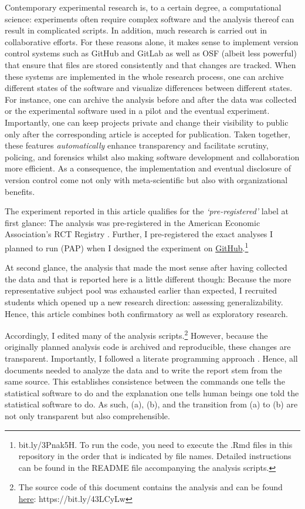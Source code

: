 \documentclass[
  authoryear,
  review,
  3p,
  onecolumn]{elsarticle}
\begin{document}
Contemporary experimental research is, to a certain degree, a
computational science: experiments often require complex software and
the analysis thereof can result in complicated scripts. In addition,
much research is carried out in collaborative efforts. For these reasons
alone, it makes sense to implement version control systems such as
GitHub and GitLab as well as OSF (albeit less powerful) that ensure that
files are stored consistently and that changes are tracked. When these
systems are implemented in the whole research process, one can archive
different states of the software and visualize differences between
different states. For instance, one can archive the analysis before and
after the data was collected or the experimental software used in a
pilot and the eventual experiment. Importantly, one can keep projects
private and change their visibility to public only after the
corresponding article is accepted for publication. Taken together, these
features \emph{automatically} enhance transparency and facilitate
scrutiny, policing, and forensics whilst also making software
development and collaboration more efficient. As a consequence, the
implementation and eventual disclosure of version control come not only
with meta-scientific but also with organizational benefits.

The experiment reported in this article qualifies for the
\emph{`pre-registered'} label at first glance: The analysis was
pre-registered in the American Economic Association's RCT Registry
\citep{preregistration}. Further, I pre-registered the exact analyses I
planned to run (PAP) when I designed the experiment on
\href{https://github.com/Howquez/GMTV/tree/July21Replication/analysis/R}{GitHub}.\footnote{bit.ly/3Pnak5H.
  To run the code, you need to execute the .Rmd files in this repository
  in the order that is indicated by file names. Detailed instructions
  can be found in the README file accompanying the analysis scripts.}

At second glance, the analysis that made the most sense after having
collected the data and that is reported here is a little different
though: Because the more representative subject pool was exhausted
earlier than expected, I recruited students which opened up a new
research direction: assessing generalizability. Hence, this article
combines both confirmatory as well as exploratory research.

Accordingly, I edited many of the analysis scripts.\footnote{The source
  code of this document contains the analysis and can be found
  \href{https://github.com/Howquez/GMTV/blob/main/analysis/article/paper.qmd}{here}:
  https://bit.ly/43LCyLw} However, because the originally planned
analysis code is archived and reproducible, these changes are
transparent. Importantly, I followed a literate programming approach
\citep{Knuth_1984, AkhtarYe_2023}. Hence, all documents needed to
analyze the data and to write the report stem from the same source. This
establishes consistence between the commands one tells the statistical
software to do and the explanation one tells human beings one told the
statistical software to do. As such, (a), (b), and the transition from
(a) to (b) are not only transparent but also comprehensible.
\end{document}
